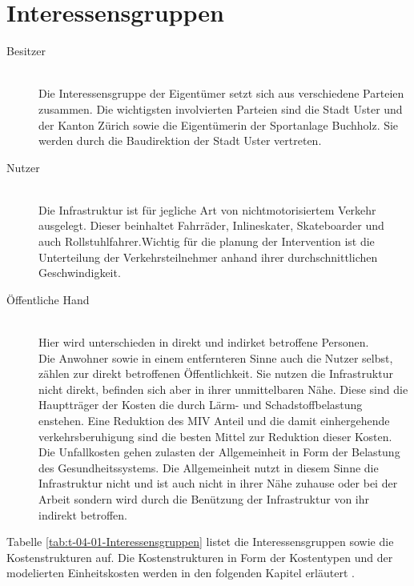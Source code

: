 %
%
%
%

\chapter{Interessensgruppen}
\label{chap:Gruppen}

\begin{description}
\item[Besitzer]\hfill \\
Die Interessensgruppe der Eigentümer setzt sich aus verschiedene Parteien zusammen. Die wichtigsten involvierten Parteien sind die Stadt Uster und der Kanton Zürich sowie die Eigentümerin der Sportanlage Buchholz. Sie werden durch die Baudirektion der Stadt Uster vertreten.
\item[Nutzer]\hfill \\ 
Die Infrastruktur ist für jegliche Art von nichtmotorisiertem Verkehr ausgelegt. Dieser beinhaltet Fahrräder, Inlineskater, Skateboarder und auch Rollstuhlfahrer.Wichtig für die planung der Intervention ist die Unterteilung der Verkehrsteilnehmer anhand ihrer durchschnittlichen Geschwindigkeit.
\item[Öffentliche Hand]\hfill \\
Hier wird unterschieden in direkt und indirket betroffene Personen.\\
Die Anwohner sowie in einem entfernteren Sinne auch die Nutzer selbst, zählen zur direkt betroffenen Öffentlichkeit. Sie nutzen die Infrastruktur nicht direkt, befinden sich aber in ihrer unmittelbaren Nähe. Diese sind die Hauptträger der Kosten die durch Lärm- und Schadstoffbelastung enstehen. Eine Reduktion des MIV Anteil und die damit einhergehende verkehrsberuhigung sind die besten Mittel zur Reduktion dieser Kosten.   \\
Die Unfallkosten gehen zulasten der Allgemeinheit in Form der Belastung des Gesundheitssystems. Die Allgemeinheit nutzt in diesem Sinne die Infrastruktur nicht und ist auch nicht in ihrer Nähe zuhause oder bei der Arbeit sondern wird durch die Benützung der Infrastruktur von ihr indirekt betroffen.
\end{description}


Tabelle \ref{tab:t-04-01-Interessensgruppen} listet die Interessensgruppen sowie die Kostenstrukturen auf. Die Kostenstrukturen in Form der Kostentypen und der modelierten Einheitskosten werden in den folgenden Kapitel erläutert .





%

